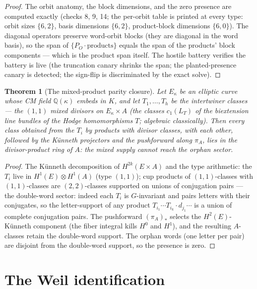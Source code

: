 \documentclass[11pt]{article}
\newtheorem{theorem}{Theorem}
\begin{document}
\begin{proof}
The orbit anatomy, the block dimensions, and the zero presence are computed exactly
(checks 8, 9, 14; the per-orbit table is printed at every type: orbit sizes $\{6,2\}$, basis
dimensions $\{6,2\}$, product-block dimensions $\{6,0\}$).  The diagonal operators preserve
word-orbit blocks (they are diagonal in the word basis), so the span of
$\{P_O \cdot \text{products}\}$ equals the span of the products' block components --- which is
the product span itself.  The hostile battery verifies the battery is live (the truncation
canary shrinks the span; the planted-presence canary is detected; the sign-flip is
discriminated by the exact solve).
\end{proof}

\begin{theorem}[The mixed-product parity closure]\label{thm:parity-mixed}
Let $E_\kappa$ be an elliptic curve whose CM field $\mathbb{Q}(\kappa)$ embeds in $K$, and let
$T_1, \dots, T_h$ be the intertwiner classes --- the $(1,1)$ mixed divisors on
$E_\kappa \times A$ (the classes $c_1(L_T)$ of the biextension line bundles of the Hodge
homomorphisms $T$; algebraic classically).  Then every class obtained from the $T_i$ by products
with divisor classes, with each other, followed by the Künneth projectors and the pushforward
along $\pi_A$, lies in the divisor-product ring of $A$: the mixed supply cannot reach the
orphan sector.
\end{theorem}

\begin{proof}
The Künneth decomposition of $H^{2k}(E \times A)$ and the type arithmetic: the $T_i$ live in
$H^1(E) \otimes H^1(A)$ (type $(1,1)$); cup products of $(1,1)$-classes with $(1,1)$-classes are
$(2,2)$-classes supported on unions of conjugation pairs --- the double-word sector: indeed each
$T_i$ is $G$-invariant and pairs letters with their conjugates, so the letter-support of any
product $T_{i_1} \cdots T_{i_k} \cdot d_{j_1} \cdots$ is a union of complete conjugation pairs.
The pushforward $(\pi_A)_*$ selects the $H^2(E)$-Künneth component (the fiber integral kills
$H^0$ and $H^1$), and the resulting $A$-classes retain the double-word support.  The orphan
words (one letter per pair) are disjoint from the double-word support, so the presence is zero.
\end{proof}

\section{The Weil identification}
\end{document}
